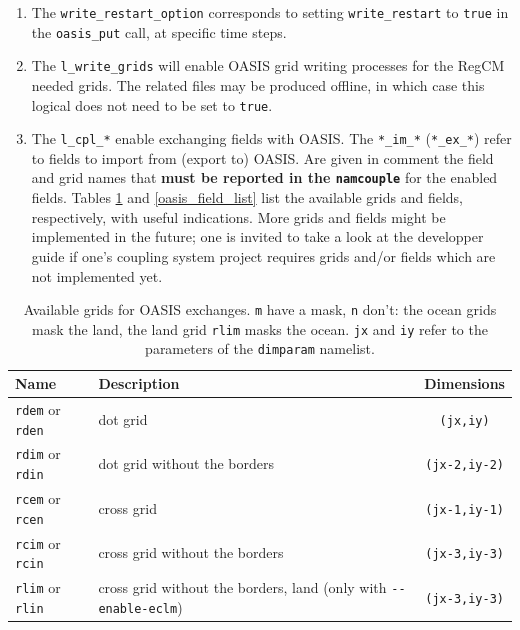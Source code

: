\begin{enumerate}
\item The \verb=write_restart_option= corresponds to setting
\verb=write_restart= to \verb=true= in the \verb=oasis_put= call, at
specific time steps.
\item The \verb=l_write_grids= will enable OASIS grid writing processes for
the RegCM needed grids. The related files may be produced offline, in which
case this logical does not need to be set to \verb=true=.
\item The \verb=l_cpl_*= enable exchanging fields with OASIS. The
\verb=*_im_*= (\verb=*_ex_*=) refer to fields to import from (export to)
OASIS. Are given in comment the field and grid names that {\bf must be reported
in the \verb=namcouple=} for the enabled fields. Tables \ref{oasis_grid_list}
and \ref{oasis_field_list} list the available grids and fields, respectively,
with useful indications. More grids and fields might be implemented in the
future; one is invited to take a look at the developper guide if one's
coupling system project requires grids and/or fields which are not
implemented yet.
\end{enumerate}

\begin{table}[ht]
\caption{Available grids for OASIS exchanges. {\tt *m} have a mask,
         {\tt *n} don't: the ocean grids mask the land, the land grid
         {\tt rlim} masks the ocean. {\tt jx} and {\tt iy} refer to the
         parameters of the {\tt dimparam} namelist.}
\vspace{0.05 in}
\centering
\begin{tabular}{l|l|c}
\hline
Name & Description & Dimensions\\
\hline
\verb=rdem= or \verb=rden= & dot grid & \verb=(jx,iy)=\\
\verb=rdim= or \verb=rdin= & dot grid without the borders & \verb=(jx-2,iy-2)=\\
\verb=rcem= or \verb=rcen= & cross grid & \verb=(jx-1,iy-1)=\\
\verb=rcim= or \verb=rcin= & cross grid without the borders & \verb=(jx-3,iy-3)=\\
\verb=rlim= or \verb=rlin= & cross grid without the borders, land
  (only with \verb=--enable-eclm=) & \verb=(jx-3,iy-3)=\\
\hline
\end{tabular}
\label{oasis_grid_list}
\end{table}


